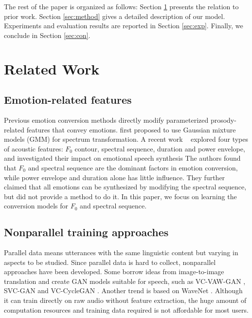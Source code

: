 \documentclass{article}
\begin{document}
The rest of the paper is organized as follows: Section \ref{sec:related} presents the relation to prior work. Section \ref{sec:method} gives a detailed description of our model. Experiments and evaluation results are reported in Section \ref{sec:exp}. Finally, we conclude in Section \ref{sec:con}.



\section{Related Work}
\label{sec:related}

\subsection{Emotion-related features}
Previous emotion conversion methods directly modify parameterized prosody-related features that convey emotions. \cite{kawanami2003gmm} first proposed to use Gaussian mixture models (GMM) for spectrum transformation.
A recent work ~\cite{xue2018voice} explored four types of acoustic features: $F_0$ contour, spectral sequence, duration and power envelope, and investigated their impact on emotional speech synthesis
The authors found that $F_0$ and spectral sequence are the dominant factors in emotion conversion, while power envelope and duration alone has little influence. They further claimed that all emotions can be synthesized by modifying the spectral sequence, but did not provide a method to do it. In this paper, we focus on learning the conversion models for $F_0$ and spectral sequence.


\subsection{Nonparallel training approaches}
Parallel data means utterances with the same linguistic content but varying in aspects to be studied. Since parallel data is hard to collect, nonparallel approaches have been developed. Some borrow ideas from image-to-image translation \cite{NIPS2017_6672} and create GAN models \cite{goodfellow2014generative} suitable for speech, such as VC-VAW-GAN \cite{Hsu2017}, SVC-GAN \cite{Kaneko2017} and VC-CycleGAN \cite{fang2018high}. Another trend is based on WaveNet \cite{van2016wavenet,tamamori2017speaker}. Although it can train directly on raw audio without feature extraction, the huge amount of computation resources and training data required is not affordable for most users.
\end{document}
